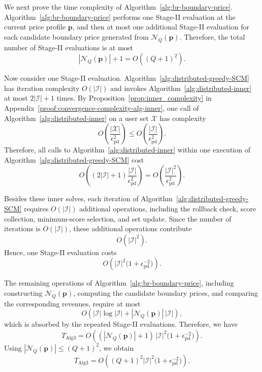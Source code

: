 \documentclass[lettersize,journal]{IEEEtran}
\begin{document}
We next prove the time complexity of Algorithm~\ref{alg:br-boundary-price}.
Algorithm~\ref{alg:br-boundary-price} performs one Stage-II evaluation at the current price profile $\boldsymbol p$, and then at most one additional Stage-II evaluation for each candidate boundary price generated from $\mathcal N_Q(\boldsymbol p)$. Therefore, the total number of Stage-II evaluations is at most
\[
|\mathcal N_Q(\boldsymbol p)| + 1 = O\!\left((Q+1)^2\right).
\]

Now consider one Stage-II evaluation. Algorithm~\ref{alg:distributed-greedy-SCM} has iteration complexity $O(|\mathcal I|)$ and invokes Algorithm~\ref{alg:distributed-inner} at most $2|\mathcal I|+1$ times. By Proposition~\ref{prop:inner_complexity} in Appendix~\ref{proof:convergence-complexity-alg-inner}, one call of Algorithm~\ref{alg:distributed-inner} on a user set $\mathcal X$ has complexity
\[
O\!\left(\frac{|\mathcal X|}{\epsilon_{\mathrm{pd}}^2}\right)
\le
O\!\left(\frac{|\mathcal I|}{\epsilon_{\mathrm{pd}}^2}\right).
\]
Therefore, all calls to Algorithm~\ref{alg:distributed-inner} within one execution of Algorithm~\ref{alg:distributed-greedy-SCM} cost
\[
O\!\left(
(2|\mathcal I|+1)\frac{|\mathcal I|}{\epsilon_{\mathrm{pd}}^2}
\right)
=
O\!\left(\frac{|\mathcal I|^2}{\epsilon_{\mathrm{pd}}^2}\right).
\]

Besides these inner solves, each iteration of Algorithm~\ref{alg:distributed-greedy-SCM} requires $O(|\mathcal I|)$ additional operations, including the rollback check, score collection, minimum-score selection, and set update. Since the number of iterations is $O(|\mathcal I|)$, these additional operations contribute
\[
O(|\mathcal I|^2).
\]
Hence, one Stage-II evaluation costs
\[
O\!\left(|\mathcal I|^2\bigl(1+\epsilon_{\mathrm{pd}}^{-2}\bigr)\right).
\]

The remaining operations of Algorithm~\ref{alg:br-boundary-price}, including constructing $\mathcal N_Q(\boldsymbol p)$, computing the candidate boundary prices, and comparing the corresponding revenues, require at most
\[
O\!\left(|\mathcal I|\log |\mathcal I| + |\mathcal N_Q(\boldsymbol p)|\,|\mathcal I|\right),
\]
which is absorbed by the repeated Stage-II evaluations. Therefore, we have
\[
T_{\mathrm{Alg3}}
=
O\!\left(
(|\mathcal N_Q(\boldsymbol p)|+1)\,|\mathcal  I|^2\bigl(1+\epsilon_{\mathrm{pd}}^{-2}\bigr)
\right).
\]
Using $|\mathcal N_Q(\boldsymbol p)| \le (Q+1)^2$, we obtain
\[
T_{\mathrm{Alg3}}
=
O\!\left(
(Q+1)^2 |\mathcal I|^2 \bigl(1+\epsilon_{\mathrm{pd}}^{-2}\bigr)
\right).
\]
\end{document}
